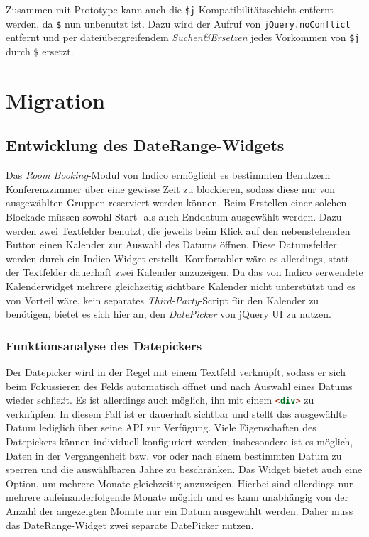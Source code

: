 Zusammen mit Prototype kann auch die \lstinline{$j}-Kompatibilitätsschicht entfernt werden, da
\lstinline{$} nun unbenutzt ist. Dazu wird der Aufruf von \lstinline{jQuery.noConflict} entfernt und
per dateiübergreifendem \emph{Suchen\&Ersetzen} jedes Vorkommen von \lstinline{$j} durch
\lstinline{$} ersetzt.

\section{Migration}

\subsection{Entwicklung des DateRange-Widgets}

Das \emph{Room Booking}-Modul von Indico ermöglicht es bestimmten Benutzern Konferenzzimmer über
eine gewisse Zeit zu blockieren, sodass diese nur von ausgewählten Gruppen reserviert werden können.
Beim Erstellen einer solchen Blockade müssen sowohl Start- als auch Enddatum ausgewählt werden.
Dazu werden zwei Textfelder benutzt, die jeweils beim Klick auf den nebenstehenden Button einen
Kalender zur Auswahl des Datums öffnen. Diese Datumsfelder werden durch ein Indico-Widget erstellt.
Komfortabler wäre es allerdings, statt der Textfelder dauerhaft zwei Kalender anzuzeigen. Da das von
Indico verwendete Kalenderwidget mehrere gleichzeitig sichtbare Kalender nicht unterstützt und es
von Vorteil wäre, kein separates \emph{Third-Party}-Script für den Kalender zu benötigen, bietet es
sich hier an, den \emph{DatePicker} von jQuery UI zu nutzen.

\subsubsection{Funktionsanalyse des Datepickers}

Der Datepicker wird in der Regel mit einem Textfeld verknüpft, sodass er sich beim Fokussieren des
Felds automatisch öffnet und nach Auswahl eines Datums wieder schließt. Es ist allerdings auch
möglich, ihn mit einem \lstinline[language=HTML]{<div>} zu verknüpfen. In diesem Fall ist er
dauerhaft sichtbar und stellt das ausgewählte Datum lediglich über seine API zur Verfügung. Viele
Eigenschaften des Datepickers können individuell konfiguriert werden; insbesondere ist es möglich,
Daten in der Vergangenheit bzw. vor oder nach einem bestimmten Datum zu sperren und die
auswählbaren Jahre zu beschränken. Das Widget bietet auch eine Option, um mehrere Monate
gleichzeitig anzuzeigen. Hierbei sind allerdings nur mehrere aufeinanderfolgende Monate möglich und
es kann unabhängig von der Anzahl der angezeigten Monate nur ein Datum ausgewählt werden. Daher muss
das DateRange-Widget zwei separate DatePicker nutzen.

